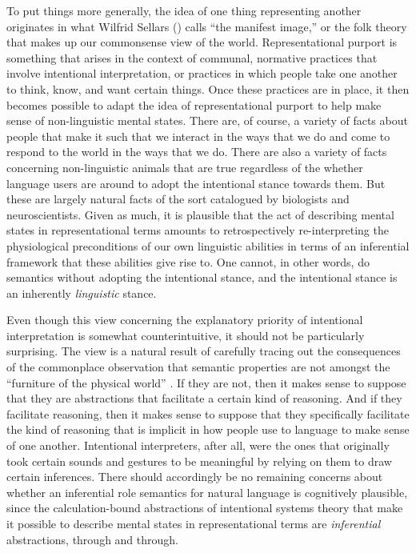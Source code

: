 To put things more generally, the idea of one thing representing another originates in what Wilfrid Sellars (\citeyear{Sellars:1963}) calls ``the manifest image,'' or the folk theory that makes up our commonsense view of the world. Representational purport is something that arises in the context of communal, normative practices that involve intentional interpretation, or practices in which people take one another to think, know, and want certain things. Once these practices are in place, it then becomes possible to adapt the idea of representational purport to help make sense of non-linguistic mental states. There are, of course, a variety of facts about people that make it such that we interact in the ways that we do and come to respond to the world in the ways that we do. There are also a variety of facts concerning non-linguistic animals that are true regardless of the whether language users are around to adopt the intentional stance towards them. But these are largely natural facts of the sort catalogued by biologists and neuroscientists. Given as much, it is plausible that the act of describing mental states in representational terms amounts to retrospectively re-interpreting the physiological preconditions of our own linguistic abilities in terms of an inferential framework that these abilities give rise to. One cannot, in other words, do semantics without adopting the intentional stance, and the intentional stance is an inherently \textit{linguistic} stance. 

Even though this view concerning the explanatory priority of intentional interpretation is somewhat counterintuitive, it should not be particularly surprising. The view is a natural result of carefully tracing out the consequences of the commonplace observation that semantic properties are not amongst the ``furniture of the physical world'' \citep[][p. 72]{Dennett:1987}. If they are not, then it makes sense to suppose that they are abstractions that facilitate a certain kind of reasoning. And if they facilitate reasoning, then it makes sense to suppose that they specifically facilitate the kind of reasoning that is implicit in how people use to language to make sense of one another. Intentional interpreters, after all, were the ones that originally took certain sounds and gestures to be meaningful by relying on them to draw certain inferences. There should accordingly be no remaining concerns about whether an inferential role semantics for natural language is cognitively plausible, since the calculation-bound abstractions of intentional systems theory that make it possible to describe mental states in representational terms are \textit{inferential} abstractions, through and through.
